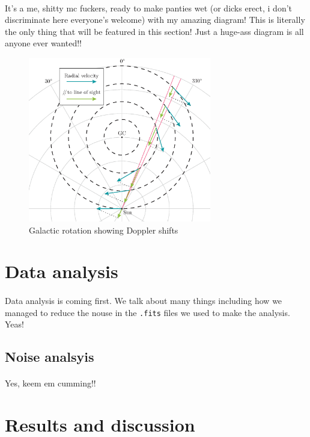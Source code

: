 \documentclass[a4paper, titlepage, oneside]{article}
\begin{document}
\begin{multicols}{2}
\paragraph{}
It's a me, shitty mc fuckers, ready to make panties wet (or dicks erect, i don't discriminate here everyone's welcome) with my amazing diagram! This is literally the only thing that will be featured in this section! Just a huge-ass diagram is all anyone ever wanted!!

\begin{figure}[H]
\centering
\includegraphics[width = 8cm]{figures/galactic-rotation}
\caption{Galactic rotation showing Doppler shifts}
\label{fig:gal-rot}
\end{figure}

\section{Data analysis}
\paragraph{}
Data analysis is coming first. We talk about many things including how we managed to reduce the nouse in the \texttt{.fits} files we used to make the analysis. Yeas!

\subsection{Noise analsyis}
\paragraph{}
Yes, keem em cumming!!

\section{Results and discussion}

\end{multicols}
\end{document}
